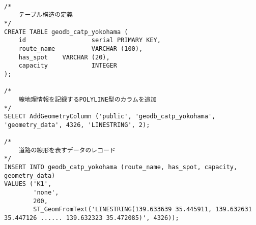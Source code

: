 \begin{lstlisting}[caption = 路線データを表すクエリーの例, label = program1]

/*
    テーブル構造の定義
*/
CREATE TABLE geodb_catp_yokohama (
    id                  serial PRIMARY KEY,
    route_name          VARCHAR (100),
    has_spot    VARCHAR (20),
    capacity            INTEGER
);

/*
    線地理情報を記録するPOLYLINE型のカラムを追加
*/
SELECT AddGeometryColumn ('public', 'geodb_catp_yokohama', 'geometry_data', 4326, 'LINESTRING', 2);

/*
    道路の線形を表すデータのレコード
*/
INSERT INTO geodb_catp_yokohama (route_name, has_spot, capacity, geometry_data)
VALUES ('K1',
        'none',
        200,
        ST_GeomFromText('LINESTRING(139.633639 35.445911, 139.632631 35.447126 ...... 139.632323 35.472085)', 4326));
\end{lstlisting}

